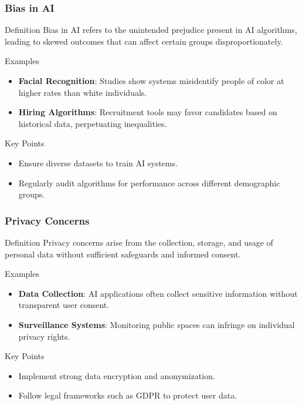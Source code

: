 \documentclass[aspectratio=169]{beamer}
\begin{document}
\begin{frame}[fragile]
    \frametitle{Bias in AI}
    \begin{block}{Definition}
        Bias in AI refers to the unintended prejudice present in AI algorithms, leading to skewed outcomes that can affect certain groups disproportionately.
    \end{block}

    \begin{block}{Examples}
        \begin{itemize}
            \item \textbf{Facial Recognition}: Studies show systems misidentify people of color at higher rates than white individuals.
            \item \textbf{Hiring Algorithms}: Recruitment tools may favor candidates based on historical data, perpetuating inequalities.
        \end{itemize}
    \end{block}

    \begin{block}{Key Points}
        \begin{itemize}
            \item Ensure diverse datasets to train AI systems.
            \item Regularly audit algorithms for performance across different demographic groups.
        \end{itemize}
    \end{block}
\end{frame}

\begin{frame}[fragile]
    \frametitle{Privacy Concerns}
    \begin{block}{Definition}
        Privacy concerns arise from the collection, storage, and usage of personal data without sufficient safeguards and informed consent.
    \end{block}

    \begin{block}{Examples}
        \begin{itemize}
            \item \textbf{Data Collection}: AI applications often collect sensitive information without transparent user consent.
            \item \textbf{Surveillance Systems}: Monitoring public spaces can infringe on individual privacy rights.
        \end{itemize}
    \end{block}

    \begin{block}{Key Points}
        \begin{itemize}
            \item Implement strong data encryption and anonymization.
            \item Follow legal frameworks such as GDPR to protect user data.
        \end{itemize}
    \end{block}
\end{frame}
\end{document}
